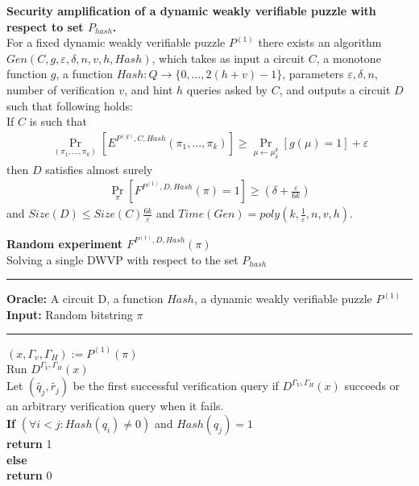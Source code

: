 %
%
\begin{lemma}\textbf{Security amplification of a dynamic weakly verifiable puzzle with respect to set $P_{hash}$.} \\
  For a fixed dynamic weakly verifiable puzzle $P^{(1)}$ there exists an algorithm\\
  $Gen(C, g, \varepsilon, \delta, n, v, h, Hash)$, which takes as input a circuit $C$, a monotone function $g$,
  a function $Hash : Q \rightarrow \{0, \dots, 2(h+v)-1\}$, parameters $\varepsilon, \delta, n$,
  number of verification $v$, and hint $h$ queries asked by $C$, and outputs a circuit $D$
  such that following holds: \\
  If $C$ is such that \\
  \begin{align*}
    \underset{(\pi_1, \dots, \pi_k)}{\Pr}[E^{P^{(g)}, C, Hash}(\pi_1, \dots, \pi_k)] \geq \underset{\mu \leftarrow \mu_\delta^k}{\Pr}[g(\mu) = 1] + \varepsilon
  \end{align*}
  then $D$ satisfies almost surely
  \begin{align*}
    \underset{\pi}{\Pr}[F^{P^{(1)},D, Hash}(\pi) = 1] \geq (\delta + \frac{\varepsilon}{6k})
  \end{align*}
  and $Size(D) \leq Size(C)\frac{6k}{\varepsilon}$ and $Time(Gen) = poly(k, \frac{1}{\varepsilon}, n, v, h)$.
\end{lemma}
%
%
\begin{codeblock}
  \textbf{Random experiment $F^{P^{(1)}, D, Hash}(\pi)$} \\
  Solving a single DWVP with respect to the set $P_{hash}$
  \medskip

  \hrule

  \medskip

  \textbf{Oracle:} A circuit D, a function $Hash$, a dynamic weakly verifiable puzzle $P^{(1)}$\\
  \textbf{Input:} Random bitstring $\pi$
  \medskip\hrule\medskip

  $(x, \Gamma_v, \Gamma_H) := P^{(1)}(\pi)$ \\
  Run $D^{\Gamma_V, \Gamma_H}(x)$ \\
  \IndI Let $(\widetilde{q_j},\widetilde{r_j})$ be the first successful verification query if $D^{\Gamma_V, \Gamma_H}(x)$ succeeds or \\
  \IndI an arbitrary verification query when it fails.\\
  \textbf{If} $(\forall i < j :  Hash(q_i) \neq 0 )$ and $Hash(q_j) = 1$ \\
  \IndI \textbf{return} 1\\
  \textbf{else}\\
  \IndI \textbf{return} 0\\

\end{codeblock}
%
%

